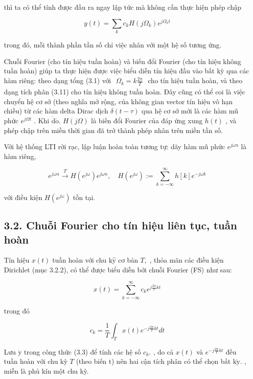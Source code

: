 \documentclass[
  10
]{article}
\begin{document}
thì ta có thể tính được đầu ra ngay lập tức mà không cần thực hiện phép
chập

\[
y (t) = \sum_ {k} c _ {k} H (j \Omega_ {k}) e ^ {j \Omega_ {k} t}
\]

trong đó, mỗi thành phần tần số chỉ việc nhân với một hệ số tương ứng.

Chuỗi Fourier (cho tín hiệu tuần hoàn) và biến đổi Fourier (cho tín hiệu
không tuần hoàn) giúp ta thực hiện được việc biểu diễn tín hiệu đầu vào
bất kỳ qua các hàm riêng: theo dạng tổng (3.1) với
\(\begin{array} { r } { \Omega _ { k } = k \frac { 2 \pi } { T } } \end{array}\)
cho tín hiệu tuần hoàn, và theo dạng tích phân (3.11) cho tín hiệu không
tuần hoàn. Đây cũng có thể coi là việc chuyển hệ cơ sở (theo nghĩa mở
rộng, của không gian vector tín hiệu vô hạn chiều) từ các hàm delta
Dirac dịch \(\delta ( t - \tau )\) qua hệ cơ sở mới là các hàm mũ phức
\(e ^ { j \Omega t }\) . Khi
\(\dot { \mathrm { d } } \acute { \mathrm { o } } .\) \(H ( j \Omega )\)
là biến đổi Fourier của đáp ứng xung \(h ( t )\) , và phép chập trên
miền thời gian đã trở thành phép nhân trên miền tần số.

Với hệ thống LTI rời rạc, lập luận hoàn toàn tương tự: dãy hàm mũ phức
\(e ^ { j \omega n }\) là hàm riêng,

\[
e ^ {j \omega n} \xrightarrow {T} H (e ^ {j \omega}) e ^ {j \omega n}, \quad H (e ^ {j \omega}) := \sum_ {k = - \infty} ^ {\infty} h [ k ] e ^ {- j \omega k}
\]

với điều kiện \(H ( e ^ { j \omega } )\) tồn tại.

\subsection{3.2. Chuỗi Fourier cho tín hiệu liên tục, tuần
hoàn}\label{chuux1ed7i-fourier-cho-tuxedn-hiux1ec7u-liuxean-tux1ee5c-tuux1ea7n-houxe0n}

Tín hiệu \(x ( t )\) tuần hoàn với chu
\(\mathrm { k } \mathrm { \hat { y } }\) cơ bản \(T ,\) , thỏa mãn các
điều kiện Dirichlet (mục 3.2.2), có thể được biểu diễn bởi chuỗi Fourier
(FS) như sau:

\[
x (t) = \sum_ {k = - \infty} ^ {\infty} c _ {k} e ^ {j \frac {2 \pi}{T} k t}\tag{3.2}
\]

trong đó

\[
c _ {k} = \frac {1}{T} \int_ {T} x (t) e ^ {- j \frac {2 \pi}{T} k t} d t\tag{3.3}
\]

Lưu \(\acute { \mathrm { y } }\) trong công thức (3.3) để tính các hệ số
\(c _ { k } .\) , do cả \(x ( t )\) và
\(e ^ { - j { \frac { 2 \pi } { T } } k t }\) đều tuần hoàn với chu kỳ
\(T\) (theo biến t) nên hai cận tích phân có thể chọn bất
\(\mathrm { k } \grave { \mathrm { y } } .\) , miễn là phủ kín một chu
kỳ.
\end{document}
